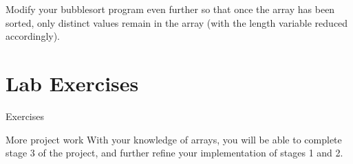 \documentclass{beamer}
\begin{document}
\begin{frame}{7.3}
    Modify your bubblesort program even further so that once the array has
    been sorted, only distinct values remain in the array (with the length
    variable reduced accordingly).
\end{frame}

\section{Lab Exercises}

\begin{frame}{Exercises}
    \begin{block}{More project work}
        With your knowledge of arrays, you will be able to complete stage
        3 of the project, and further refine your implementation of stages
        1 and 2.
    \end{block}
\end{frame}
\end{document}
